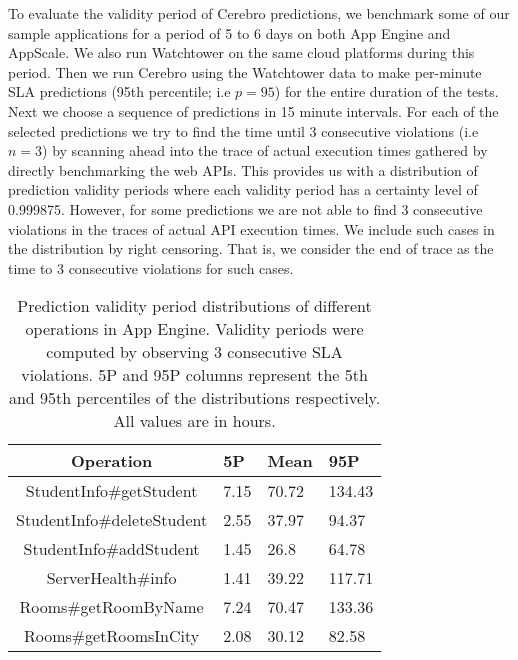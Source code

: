 To evaluate the validity period of Cerebro predictions, we benchmark some of our sample applications for a period of 5 to 6 days on both
App Engine and AppScale. We also run Watchtower on the same cloud platforms during this period. Then we run Cerebro using
the Watchtower data to make per-minute SLA predictions (95th percentile; i.e $p=95$) for the entire duration of the tests. Next we choose a sequence of predictions
in 15 minute intervals. For each of the selected predictions we try to find the time until 3 consecutive violations (i.e $n=3$) by scanning ahead into the trace of
actual execution times gathered by directly benchmarking the web APIs. This provides us with a distribution of prediction validity periods where
each validity period has a certainty level of 0.999875.
However, for some predictions we are not able to find 3 consecutive violations in the traces of actual API execution times. We include
such cases in the distribution by right censoring. That is, we consider the end of trace as the time to 3 consecutive violations for such cases.


\begin{table}[htdp]
\caption{Prediction validity period distributions of different operations in App Engine. Validity periods were computed by observing 3 consecutive SLA violations. 5P and 95P columns represent the 5th and 95th percentiles of the
distributions respectively. All values are in hours.}
\begin{center}
\begin{tabular}{|c|p{1cm}|p{1cm}|p{1cm}|}
\hline
Operation & 5P & Mean & 95P \\ \hline
StudentInfo\#getStudent & 7.15 & 70.72 & 134.43 \\ \hline
StudentInfo\#deleteStudent & 2.55 & 37.97 & 94.37 \\ \hline
StudentInfo\#addStudent & 1.45 & 26.8 & 64.78 \\ \hline
ServerHealth\#info & 1.41 & 39.22 & 117.71 \\ \hline
Rooms\#getRoomByName & 7.24 & 70.47 & 133.36 \\ \hline
Rooms\#getRoomsInCity & 2.08 & 30.12 & 82.58 \\ \hline
\end{tabular}
\end{center}
\label{tab:gae_validity}
\end{table}

